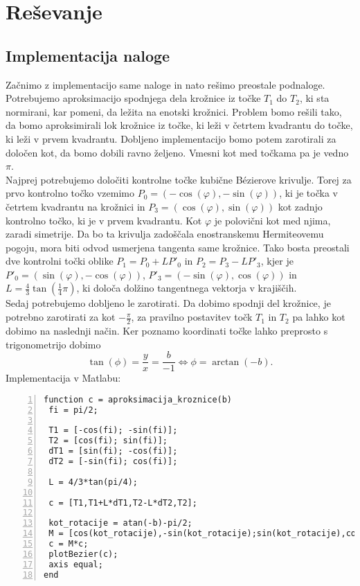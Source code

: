 \documentclass[a4paper,12pt]{article}
\begin{document}
	\section{Reševanje}
	\subsection{Implementacija naloge}
	
	Začnimo z implementacijo same naloge in nato rešimo preostale podnaloge.
	Potrebujemo aproksimacijo spodnjega dela krožnice iz točke $T_1$ do $T_2$, ki sta normirani, kar pomeni, da ležita na enotski krožnici.
	Problem bomo rešili tako, da bomo aproksimirali lok krožnice iz točke, ki leži v četrtem kvadrantu do točke, ki leži v prvem kvadrantu. 
	Dobljeno implementacijo bomo potem zarotirali za določen kot, da bomo dobili ravno željeno. Vmesni kot med točkama pa je vedno $\pi$.
	\\
	Najprej potrebujemo določiti kontrolne točke kubične B\'{e}zierove krivulje. Torej za prvo kontrolno točko vzemimo $P_0 = (-\cos(\varphi), -\sin(\varphi))$, 
	ki je točka v četrtem kvadrantu na krožnici in 
	$P_3 = (\cos(\varphi), \sin(\varphi))$ kot zadnjo kontrolno točko, ki je v prvem kvadrantu. Kot $\varphi$ je polovični kot med njima, zaradi simetrije.
	Da bo ta krivulja zadoščala enostranskemu Hermiteovemu pogoju, mora biti odvod usmerjena tangenta same krožnice.
	Tako bosta preostali dve kontrolni točki oblike $P_1 = P_0 + LP'_0$ in $P_2 = P_3 - LP'_3$, kjer je $P'_0 = (\sin(\varphi), -\cos(\varphi))$, $P'_3 = (-\sin(\varphi), \cos(\varphi))$ in
	$L = \frac{4}{3} \tan(\frac{1}{4}\pi)$, ki določa dolžino tangentnega vektorja v krajiščih.
	\\
	Sedaj potrebujemo dobljeno le zarotirati. Da dobimo spodnji del krožnice, je potrebno zarotirati za kot $-\frac{\pi}{2}$, za pravilno postavitev 
	točk $T_1$ in $T_2$ pa lahko kot dobimo na naslednji način. Ker poznamo koordinati točke lahko preprosto s trigonometrijo dobimo
	$$\tan(\phi) = \frac{y}{x} = \frac{b}{-1} \Leftrightarrow \phi = \arctan(-b).$$
	Implementacija v Matlabu:
	
	\begin{lstlisting}[style=Matlab-editor,	numbers=left,]
function c = aproksimacija_kroznice(b)
 fi = pi/2;
		
 T1 = [-cos(fi); -sin(fi)];
 T2 = [cos(fi); sin(fi)];
 dT1 = [sin(fi); -cos(fi)];
 dT2 = [-sin(fi); cos(fi)];
		
 L = 4/3*tan(pi/4);
		
 c = [T1,T1+L*dT1,T2-L*dT2,T2];
		
 kot_rotacije = atan(-b)-pi/2;
 M = [cos(kot_rotacije),-sin(kot_rotacije);sin(kot_rotacije),cos(kot_rotacije)];
 c = M*c;
 plotBezier(c); 
 axis equal;
end
	\end{lstlisting}
	
\end{document}
